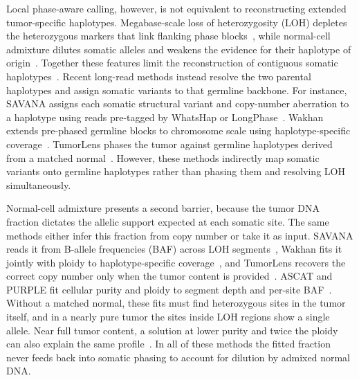 \documentclass[unnumsec,webpdf,contemporary,large]{oup-authoring-template}
\begin{document}
Local phase-aware calling, however, is not equivalent to reconstructing extended tumor-specific haplotypes. Megabase-scale loss of heterozygosity (LOH) depletes the heterozygous markers that link flanking phase blocks~\cite{nichols2020,regan2024,hwang2021}, while normal-cell admixture dilutes somatic alleles and weakens the evidence for their haplotype of origin~\cite{yadav2015,zheng2017,rhee2018}. Together these features limit the reconstruction of contiguous somatic haplotypes~\cite{foltz2024}. Recent long-read methods instead resolve the two parental haplotypes and assign somatic variants to that germline backbone. For instance, SAVANA assigns each somatic structural variant and copy-number aberration to a haplotype using reads pre-tagged by WhatsHap or LongPhase~\cite{elrick2025}. Wakhan extends pre-phased germline blocks to chromosome scale using haplotype-specific coverage~\cite{ahmad2025}. TumorLens phases the tumor against germline haplotypes derived from a matched normal~\cite{paulin2026}. However, these methods indirectly map somatic variants onto germline haplotypes rather than phasing them and resolving LOH simultaneously.

Normal-cell admixture presents a second barrier, because the tumor DNA fraction dictates the allelic support expected at each somatic site. The same methods either infer this fraction from copy number or take it as input. SAVANA reads it from B-allele frequencies (BAF) across LOH segments~\cite{elrick2025}, Wakhan fits it jointly with ploidy to haplotype-specific coverage~\cite{ahmad2025}, and TumorLens recovers the correct copy number only when the tumor content is provided~\cite{paulin2026}. ASCAT and PURPLE fit cellular purity and ploidy to segment depth and per-site BAF~\cite{vanloo2010,priestley2019}. Without a matched normal, these fits must find heterozygous sites in the tumor itself, and in a nearly pure tumor the sites inside LOH regions show a single allele. Near full tumor content, a solution at lower purity and twice the ploidy can also explain the same profile~\cite{vanloo2010,priestley2019}. In all of these methods the fitted fraction never feeds back into somatic phasing to account for dilution by admixed normal DNA.
\end{document}
